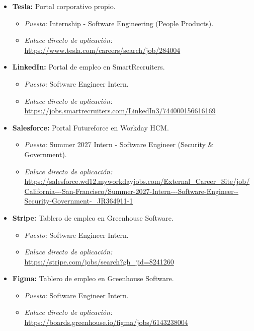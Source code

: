\documentclass[12pt]{article}
\begin{document}
\begin{itemize}[leftmargin=0.2in, itemsep=0.3em]
    \item \textbf{Tesla:} Portal corporativo propio.
    \begin{itemize}[leftmargin=0.15in, noitemsep]
        \item \textit{Puesto:} Internship - Software Engineering (People Products).
        \item \textit{Enlace directo de aplicación:}\\ {\small\url{https://www.tesla.com/careers/search/job/284004}}
    \end{itemize}

    \item \textbf{LinkedIn:} Portal de empleo en SmartRecruiters.
    \begin{itemize}[leftmargin=0.15in, noitemsep]
        \item \textit{Puesto:} Software Engineer Intern.
        \item \textit{Enlace directo de aplicación:}\\ {\small\url{https://jobs.smartrecruiters.com/LinkedIn3/744000156616169}}
    \end{itemize}

    \item \textbf{Salesforce:} Portal Futureforce en Workday HCM.
    \begin{itemize}[leftmargin=0.15in, noitemsep]
        \item \textit{Puesto:} Summer 2027 Intern - Software Engineer (Security \& Government).
        \item \textit{Enlace directo de aplicación:}\\ {\footnotesize\url{https://salesforce.wd12.myworkdayjobs.com/External_Career_Site/job/California---San-Francisco/Summer-2027-Intern---Software-Engineer--Security-Government-_JR364911-1}}
    \end{itemize}

    \item \textbf{Stripe:} Tablero de empleo en Greenhouse Software.
    \begin{itemize}[leftmargin=0.15in, noitemsep]
        \item \textit{Puesto:} Software Engineer Intern.
        \item \textit{Enlace directo de aplicación:}\\ {\small\url{https://stripe.com/jobs/search?gh_jid=8241260}}
    \end{itemize}

    \item \textbf{Figma:} Tablero de empleo en Greenhouse Software.
    \begin{itemize}[leftmargin=0.15in, noitemsep]
        \item \textit{Puesto:} Software Engineer Intern.
        \item \textit{Enlace directo de aplicación:}\\ {\small\url{https://boards.greenhouse.io/figma/jobs/6143238004}}
    \end{itemize}


\end{itemize}
\end{document}
